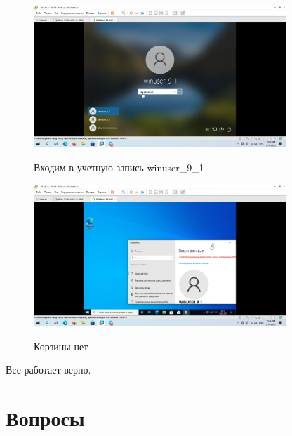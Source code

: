 \documentclass[a4paper]{article}
\begin{document}
  \begin{figure}[H]
    \centering
    \includegraphics[width=0.85\textwidth]{5_0178}
    \label{img:178}
    \caption{Входим в учетную запись winuser\_9\_1}
  \end{figure}

  \begin{figure}[H]
    \centering
    \includegraphics[width=0.85\textwidth]{5_0179}
    \label{img:179}
    \caption{Корзины нет}
  \end{figure}

  Все работает верно.

  \newpage
  \section{Вопросы}
\end{document}
